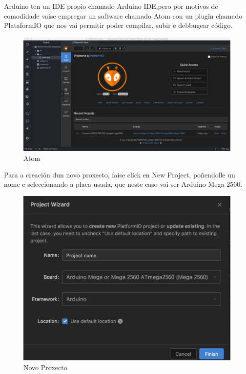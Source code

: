 \documentclass[11pt,twoside]{book}
\begin{document}
Arduino ten un IDE propio chamado Arduino IDE,pero por motivos de comodidade vaise empregar un software chamado Atom con un plugin chamado PlataformIO que nos vai permitir poder compilar, subir e debbugear código.

\begin{figure}[H]
	\begin{center}
		\includegraphics[width=15cm]{images/Atom.png}
	\end{center}
	\caption{Atom}
	\label{fig:Atom}
\end{figure}

Para a creación dun novo proxecto, faise click en New Project, poñendolle un nome e seleccionando a placa usada, que neste caso vai ser Arduino Mega 2560.

\begin{figure}[H]
	\begin{center}
		\includegraphics[width=15cm]{images/NewProject.png}
	\end{center}
	\caption{Novo Proxecto}
	\label{fig:NewProject}
\end{figure}
\end{document}
